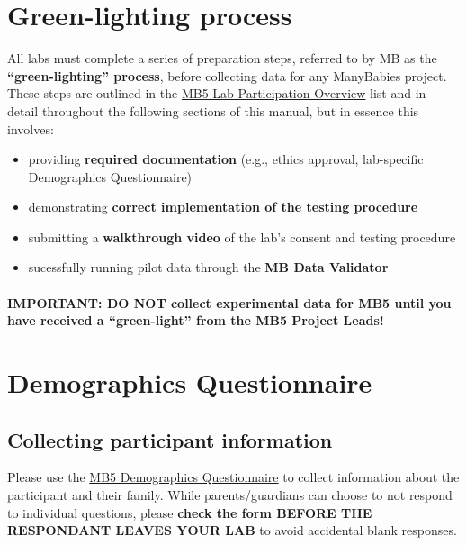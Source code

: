 \documentclass[
  letterpaper,
  DIV=11,
  numbers=noendperiod,
  oneside]{scrreprt}
\providecommand{\tightlist}{%
  \setlength{\itemsep}{0pt}\setlength{\parskip}{0pt}}
\begin{document}
\chapter{Green-lighting process}\label{sec-greenlight}

All labs must complete a series of preparation steps, referred to by MB
as the \textbf{``green-lighting'' process}, before collecting data for
any ManyBabies project. These steps are outlined in the
\hyperref[sec-laboverview]{MB5 Lab Participation Overview} list and in
detail throughout the following sections of this manual, but in essence
this involves:

\begin{itemize}
\tightlist
\item
  providing \textbf{required documentation} (e.g., ethics approval,
  lab-specific Demographics Questionnaire)
\item
  demonstrating \textbf{correct implementation of the testing procedure}
\item
  submitting a \textbf{walkthrough video} of the lab's consent and
  testing procedure
\item
  sucessfully running pilot data through the \textbf{MB Data Validator}
\end{itemize}

\subsubsection{IMPORTANT: DO NOT collect experimental data for MB5 until
you have received a ``green-light'' from the MB5 Project
Leads!}\label{important-do-not-collect-experimental-data-for-mb5-until-you-have-received-a-green-light-from-the-mb5-project-leads}

\chapter{Demographics Questionnaire}\label{sec-demographics}

\section{Collecting participant
information}\label{collecting-participant-information}

Please use the
\href{https://drive.google.com/drive/folders/1-3QWj7jg10KTWBsHqRPaRiqRwyHZfDD1?usp=sharing}{MB5
Demographics Questionnaire} to collect information about the
participant and their family. While parents/guardians can choose to not
respond to individual questions, please \textbf{check the form BEFORE
THE RESPONDANT LEAVES YOUR LAB} to avoid accidental blank responses.
\end{document}
